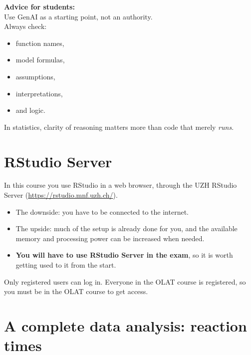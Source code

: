 \documentclass[
  letterpaper,
  8pt,
  a4paper]{book}
\providecommand{\tightlist}{%
  \setlength{\itemsep}{0pt}\setlength{\parskip}{0pt}}
\begin{document}
\textbf{Advice for students:}\\
Use GenAI as a starting point, not an authority.\\
Always check:

\begin{itemize}
\tightlist
\item
  function names,\\
\item
  model formulas,\\
\item
  assumptions,\\
\item
  interpretations,\\
\item
  and logic.
\end{itemize}

In statistics, clarity of reasoning matters more than code that merely
\emph{runs}.

\section*{RStudio Server}\label{rstudio-server}


In this course you use RStudio in a web browser, through the UZH RStudio
Server (\url{https://rstudio.mnf.uzh.ch/}).

\begin{itemize}
\tightlist
\item
  The downside: you have to be connected to the internet.
\item
  The upside: much of the setup is already done for you, and the
  available memory and processing power can be increased when needed.
\item
  \textbf{You will have to use RStudio Server in the exam}, so it is
  worth getting used to it from the start.
\end{itemize}

Only registered users can log in. Everyone in the OLAT course is
registered, so you must be in the OLAT course to get access.

\section*{A complete data analysis: reaction
times}\label{a-complete-data-analysis-reaction-times}
\end{document}
